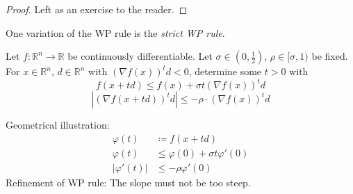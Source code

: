 \documentclass[a4paper]{article}
\numberwithin{lecref}{subsection}
\newcommand{\Abs}[1]{\left|#1\right|}
\begin{document}
\begin{proof}
	Left as an exercise to the reader.
\end{proof}

One variation of the WP rule is the \emph{strict WP rule}.

Let $f: \mathbb R^n \to \mathbb R$ be continuously differentiable.
Let $\sigma \in (0, \frac12)$, $\rho \in [\sigma, 1)$ be fixed.
For $x \in \mathbb R^n$, $d \in \mathbb R^n$ with $(\nabla f(x))^t d < 0$, determine some $t > 0$ with
\[ f(x + td) \leq f(x) + \sigma t(\nabla f(x))^t d \]
\[ \Abs{(\nabla f(x + td))^t d} \leq -\rho \cdot (\nabla f(x))^t d \]

Geometrical illustration:
\begin{align*}
	\varphi(t) &\coloneqq f(x + td) \\
	\varphi(t) &\leq \varphi(0) + \sigma t \varphi'(0) \\
	\Abs{\varphi'(t)} &\leq -\rho \varphi'(0)
\end{align*}
Refinement of WP rule: The slope must not be too steep.

\end{document}
